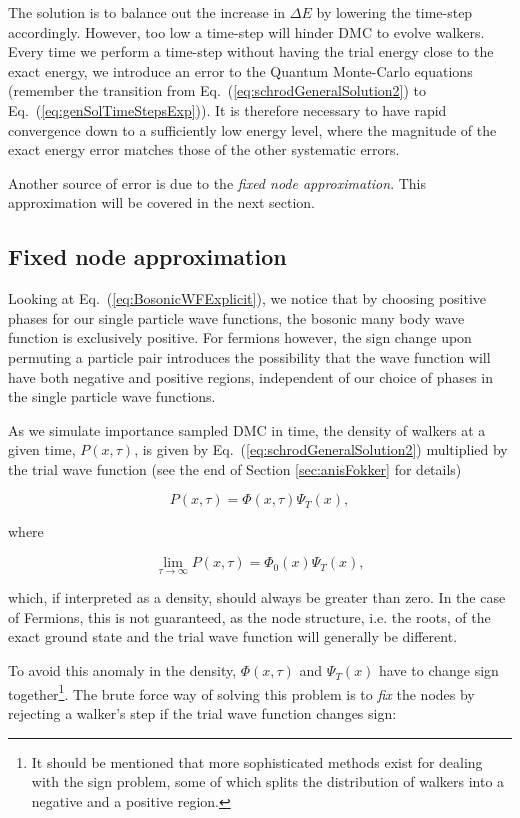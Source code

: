 The solution is to balance out the increase in $\Delta E$ by lowering the time-step accordingly. However, too low a time-step will hinder DMC to evolve walkers. Every time we perform a time-step without having the trial energy close to the exact energy, we introduce an error to the Quantum Monte-Carlo equations (remember the transition from Eq.~(\ref{eq:schrodGeneralSolution2}) to Eq.~(\ref{eq:genSolTimeStepsExp})). It is therefore necessary to have rapid convergence down to a sufficiently low energy level, where the magnitude of the exact energy error matches those of the other systematic errors.

Another source of error is due to the \textit{fixed node approximation}. This approximation will be covered in the next section.

\subsection{Fixed node approximation}

Looking at Eq.~(\ref{eq:BosonicWFExplicit}), we notice that by choosing positive phases for our single particle wave functions, the bosonic many body wave function is exclusively positive. For fermions however, the sign change upon permuting a particle pair introduces the possibility that the wave function will have both negative and positive regions, independent of our choice of phases in the single particle wave functions.

As we simulate importance sampled DMC in time, the density of walkers at a given time, $P(x, \tau)$, is given by Eq.~(\ref{eq:schrodGeneralSolution2}) multiplied by the trial wave function (see the end of Section \ref{sec:anisFokker} for details)

\begin{equation}
 P(x, \tau) = \Phi(x, \tau)\Psi_T(x),
\end{equation}

where

\begin{equation}
  \lim_{\tau\to\infty} P(x, \tau) = \Phi_0(x)\Psi_T(x),
\end{equation}

which, if interpreted as a density, should always be greater than zero. In the case of Fermions, this is not guaranteed, as
the node structure, i.e. the roots, of the exact ground state and the trial wave function will generally be different.  

To avoid this anomaly in the density, $\Phi(x, \tau)$ and $\Psi_T(x)$ have to change sign together\footnote{It should be mentioned that more sophisticated methods exist for dealing with the sign problem, some of which splits the distribution of walkers into a negative and a positive region.}. The brute force way of solving this problem is to \textit{fix} the nodes by rejecting a walker's step if the trial wave function changes sign:

